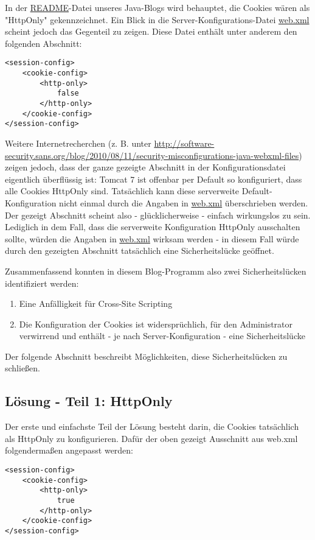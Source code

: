 In der \url{README}-Datei unseres Java-Blogs wird behauptet, die Cookies wären als "HttpOnly" gekennzeichnet. Ein Blick in die Server-Konfigurations-Datei \url{web.xml} scheint jedoch das Gegenteil zu zeigen. Diese Datei enthält unter anderem den folgenden Abschnitt:

\begin{lstlisting}
<session-config>
	<cookie-config>
		<http-only>
			false
		</http-only>
	</cookie-config>
</session-config>
\end{lstlisting}

Weitere Internetrecherchen (z. B. unter \url{http://software-security.sans.org/blog/2010/08/11/security-misconfigurations-java-webxml-files}) zeigen jedoch, dass der ganze gezeigte Abschnitt in der Konfigurationsdatei eigentlich überflüssig ist: Tomcat 7 ist offenbar per Default so konfiguriert, dass alle Cookies HttpOnly sind. Tatsächlich kann diese serverweite Default-Konfiguration nicht einmal durch die Angaben in \url{web.xml} überschrieben werden. Der gezeigt Abschnitt scheint also - glücklicherweise - einfach wirkungslos zu sein. Lediglich in dem Fall, dass die serverweite Konfiguration HttpOnly ausschalten sollte, würden die Angaben in \url{web.xml} wirksam werden - in diesem Fall würde durch den gezeigten Abschnitt tatsächlich eine Sicherheitslücke geöffnet.

Zusammenfassend konnten in diesem Blog-Programm also zwei Sicherheitslücken identifiziert werden:

\begin{enumerate}
\item Eine Anfälligkeit für Cross-Site Scripting
\item Die Konfiguration der Cookies ist widersprüchlich, für den Administrator verwirrend und enthält - je nach Server-Konfiguration - eine Sicherheitslücke
\end{enumerate}

Der folgende Abschnitt beschreibt Möglichkeiten, diese Sicherheitslücken zu schließen.

\subsection{Lösung - Teil 1: HttpOnly}

Der erste und einfachste Teil der Lösung besteht darin, die Cookies tatsächlich als HttpOnly zu konfigurieren. Dafür der oben gezeigt Ausschnitt aus web.xml folgendermaßen angepasst werden:

\begin{lstlisting}
<session-config>
	<cookie-config>
		<http-only>
			true
		</http-only>
	</cookie-config>
</session-config>
\end{lstlisting}

